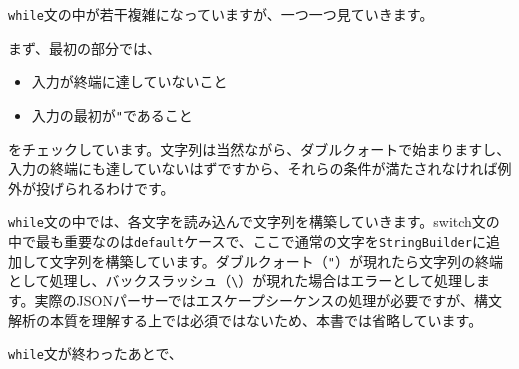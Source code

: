 \texttt{while}文の中が若干複雑になっていますが、一つ一つ見ていきます。

まず、最初の部分では、

\begin{Shaded}
\begin{Highlighting}[]
        \NormalTok{()) \{}
              \NormalTok{(}\NormalTok{ + }\NormalTok{);}
\NormalTok{        \}}
        \NormalTok{) \{}
              \NormalTok{(}\NormalTok{ + }
\NormalTok{        \}}
\end{Highlighting}
\end{Shaded}

\begin{itemize}
\tightlist
\item
  入力が終端に達していないこと
\item
  入力の最初が\texttt{"}であること
\end{itemize}

をチェックしています。文字列は当然ながら、ダブルクォートで始まりますし、入力の終端にも達していないはずですから、それらの条件が満たされなければ例外が投げられるわけです。

\texttt{while}文の中では、各文字を読み込んで文字列を構築していきます。switch文の中で最も重要なのは\texttt{default}ケースで、ここで通常の文字を\texttt{StringBuilder}に追加して文字列を構築しています。ダブルクォート（\texttt{"}）が現れたら文字列の終端として処理し、バックスラッシュ（\texttt{\textbackslash{}}）が現れた場合はエラーとして処理します。実際のJSONパーサーではエスケープシーケンスの処理が必要ですが、構文解析の本質を理解する上では必須ではないため、本書では省略しています。

\texttt{while}文が終わったあとで、

\begin{Shaded}
\begin{Highlighting}[]
        \NormalTok{) \{}
              \NormalTok{(}\NormalTok{ + }\NormalTok{ + }
\NormalTok{        \} }\NormalTok{ \{}
            \NormalTok{();}
             \NormalTok{());}
\NormalTok{        \}}
\end{Highlighting}
\end{Shaded}

